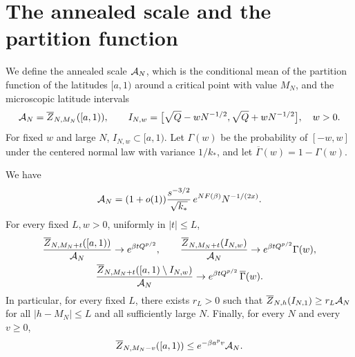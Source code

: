 \section{The annealed scale and the partition function}\label{sec:pc-laplace}

We define the annealed scale $\mathcal A_N$, which is the conditional mean of the partition function of the latitudes $[a,1)$ around a critical point with value $M_N$, and the microscopic latitude intervals
\[
\mathcal A_N=\overline Z_{N,M_N}([a,1)),\qquad I_{N,w}=\bigl[\sqrt Q-wN^{-1/2},\sqrt Q+wN^{-1/2}\bigr],\quad w>0.
\]
For fixed $w$ and large $N$, $I_{N,w}\subset[a,1)$. Let $\Gamma(w)$ be the probability of $[-w,w]$ under the centered normal law with variance $1/k_*$, and let $\overline\Gamma(w)=1-\Gamma(w)$.

\begin{proposition}\label{prop:pc-laplace}
We have
\begin{equation}\label{eq:pc-scale}
\mathcal A_N=(1+o(1))\frac{s^{-3/2}}{\sqrt{k_*}}\,e^{NF(\beta)}N^{-1/(2x)}.
\end{equation}
For every fixed $L,w>0$, uniformly in $|t|\le L$,
\begin{equation}\label{eq:pc-laplace}
\begin{gathered}
\frac{\overline Z_{N,M_N+t}([a,1))}{\mathcal A_N}\to e^{\beta tQ^{p/2}},\qquad\frac{\overline Z_{N,M_N+t}(I_{N,w})}{\mathcal A_N}\to e^{\beta tQ^{p/2}}\Gamma(w),\\
\frac{\overline Z_{N,M_N+t}([a,1)\setminus I_{N,w})}{\mathcal A_N}\to e^{\beta tQ^{p/2}}\,\overline\Gamma(w).
\end{gathered}
\end{equation}
In particular, for every fixed $L$, there exists $r_L>0$ such that $\overline Z_{N,h}(I_{N,1})\ge r_L\mathcal A_N$ for all $|h-M_N|\le L$ and all sufficiently large $N$. Finally, for every $N$ and every $v\ge0$,
\begin{equation}\label{eq:pc-depth}
\overline Z_{N,M_N-v}([a,1))\le e^{-\beta a^pv}\mathcal A_N.
\end{equation}
\end{proposition}

